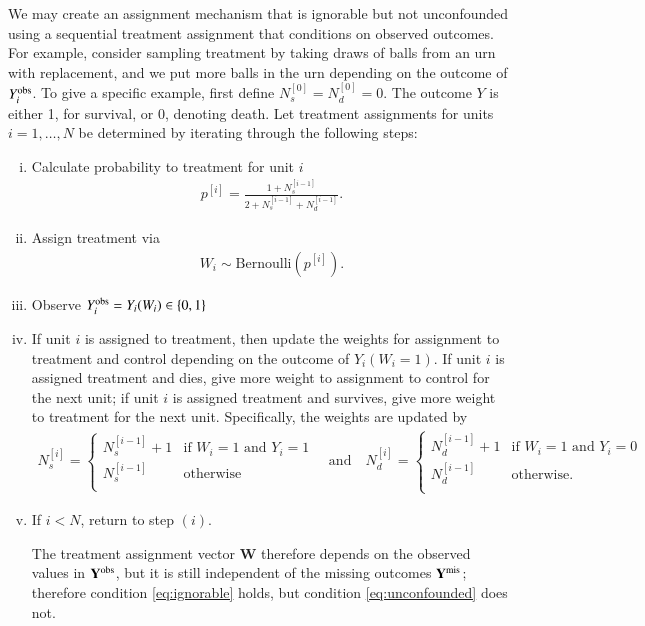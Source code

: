 We may create an assignment mechanism that is ignorable but not
unconfounded using a sequential treatment assignment that conditions
on observed outcomes.  For example, consider sampling treatment by
taking draws of balls from an urn with replacement, and we put more
balls in the urn depending on the outcome of $Y_i^{\text{obs}}$.  To give a
specific example, first define $N_s^{[0]} = N_d^{[0]} = 0$.  The
outcome $Y$ is either 1, for survival, or 0, denoting death.  Let
treatment assignments for units $i=1, \ldots, N$ be determined by
iterating through the following steps:
\begin{enumerate}[(i)]
\item Calculate probability to treatment for unit $i$
  \begin{align*}
    p^{[i]} = \frac{1 + N_s^{[i-1]}}{2 + N_s^{[i-1]} + N_d^{[i-1]}}.
\end{align*}
\item Assign treatment via
  \begin{align*}
    W_i \sim \text{Bernoulli}(p^{[i]}) .
  \end{align*}
\item Observe $Y_i^{\text{obs}} = Y_i(W_i) \in \{0, 1\}$
\item If unit $i$ is assigned to treatment, then update the weights
  for assignment to treatment and control depending on the outcome of
  $Y_i(W_i = 1)$.  If unit $i$ is assigned treatment and dies, give
  more weight to assignment to control for the next unit; if unit $i$
  is assigned treatment and survives, give more weight to treatment
  for the next unit.  Specifically, the weights are updated by
  \begin{align*}
    N_s^{[i]} =
    \begin{cases}
      N_s^{[i-1]} + 1 & \text{if } W_i = 1  \text{ and } Y_i = 1  \\
      N_s^{[i-1]} & \text{otherwise} \\
    \end{cases} \quad \text{and} \quad
    N_d^{[i]} =
    \begin{cases}
      N_d^{[i-1]} + 1 & \text{if } W_i = 1  \text{ and } Y_i = 0 \\
      N_d^{[i-1]} & \text{otherwise}. \\
    \end{cases}
  \end{align*}

\item If $i < N$, return to step $(i)$. 

    The treatment assignment vector $\mathbf{W}$ therefore depends on
  the observed values in $\mathbf{Y}^{\text{obs}}$, but it is still independent of the
  missing outcomes $\mathbf{Y}^{\text{mis}}$; therefore condition \eqref{eq:ignorable}
  holds, but condition \eqref{eq:unconfounded} does not.


\end{enumerate}



